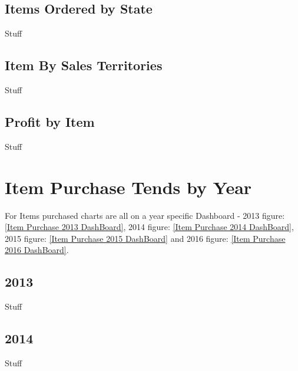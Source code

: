 \documentclass[12pt]{article}
\begin{document}
\subsection{Items Ordered by State}
\begin{flushleft}
Stuff

\end{flushleft}

\subsection{Item By Sales Territories}
\begin{flushleft}
Stuff

\end{flushleft}

\subsection{Profit by Item}
\begin{flushleft}
Stuff

\end{flushleft}

\section{Item Purchase Tends by Year}

\begin{flushleft}
    For Items purchased charts are all on a year specific Dashboard - 2013 figure: \ref{Item Purchase 2013 DashBoard}, 2014 figure: \ref{Item Purchase 2014 DashBoard}, 2015 figure: \ref{Item Purchase 2015 DashBoard} and 2016 figure: \ref{Item Purchase 2016 DashBoard}.
\end{flushleft}

\subsection{2013}
\begin{flushleft}
Stuff

\end{flushleft}

\subsection{2014}
\begin{flushleft}
Stuff

\end{flushleft}
\end{document}
